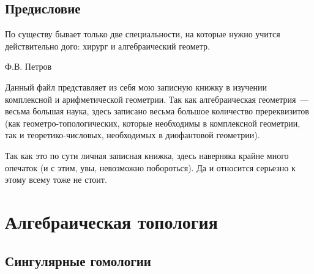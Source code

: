 \documentclass[dvipsnames, 11pt]{book}
\begin{document}
    
    
    \begin{center}
        \section*{Предисловие}
    \end{center}

    \epigraph{По существу бывает только две специальности, на которые нужно учится действительно дого: хирург и алгебраический геометр.}{Ф.В. Петров}

    Данный файл представляет из себя мою записную книжку в изучении комплексной и арифметической геометрии. Так как алгебраическая геометрия~--- весьма большая наука, здесь записано весьма большое количество пререквизитов (как геометро-топологических, которые необходимы в комплексной геометрии, так и теоретико-числовых, необходимых в диофантовой геометрии). 

    Так как это по сути личная записная книжка, здесь наверняка крайне много опечаток (и с этим, увы, невозможно побороться). Да и относится серьезно к этому всему тоже не стоит. 

    
    \tableofcontents

    \newpage

    \chapter{Алгебраическая топология}

    \section{Сингулярные гомологии}

    
    
    
    
    
    
    
    
\end{document}
